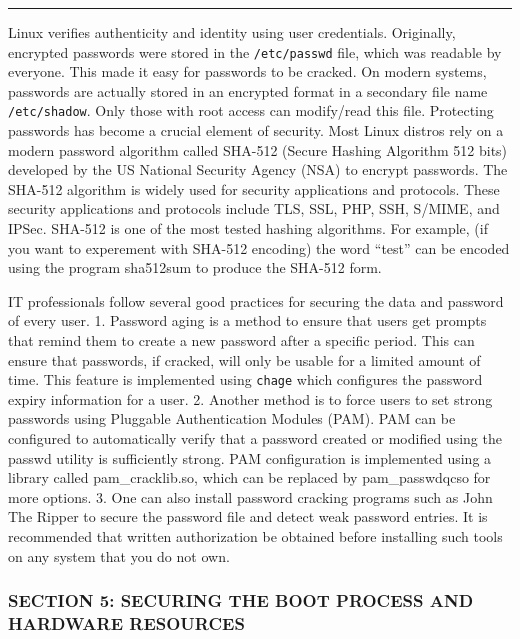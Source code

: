 \begin{center}\rule{3in}{0.4pt}\end{center}

Linux verifies authenticity and identity using user credentials.
Originally, encrypted passwords were stored in the \texttt{/etc/passwd}
file, which was readable by everyone. This made it easy for passwords to
be cracked. On modern systems, passwords are actually stored in an
encrypted format in a secondary file name \texttt{/etc/shadow}. Only
those with root access can modify/read this file. Protecting passwords
has become a crucial element of security. Most Linux distros rely on a
modern password algorithm called SHA-512 (Secure Hashing Algorithm 512
bits) developed by the US National Security Agency (NSA) to encrypt
passwords. The SHA-512 algorithm is widely used for security
applications and protocols. These security applications and protocols
include TLS, SSL, PHP, SSH, S/MIME, and IPSec. SHA-512 is one of the
most tested hashing algorithms. For example, (if you want to experement
with SHA-512 encoding) the word ``test'' can be encoded using the
program sha512sum to produce the SHA-512 form.

IT professionals follow several good practices for securing the data and
password of every user. 1. Password aging is a method to ensure that
users get prompts that remind them to create a new password after a
specific period. This can ensure that passwords, if cracked, will only
be usable for a limited amount of time. This feature is implemented
using \texttt{chage} which configures the password expiry information
for a user. 2. Another method is to force users to set strong passwords
using Pluggable Authentication Modules (PAM). PAM can be configured to
automatically verify that a password created or modified using the
passwd utility is sufficiently strong. PAM configuration is implemented
using a library called pam\_cracklib.so, which can be replaced by
pam\_passwdqcso for more options. 3. One can also install password
cracking programs such as John The Ripper to secure the password file
and detect weak password entries. It is recommended that written
authorization be obtained before installing such tools on any system
that you do not own.

\subsubsection{SECTION 5: SECURING THE BOOT PROCESS AND HARDWARE
RESOURCES}\label{section-5-securing-the-boot-process-and-hardware-resources}

